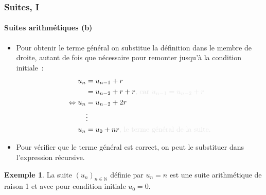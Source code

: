 \documentclass[10pt,notheorems]{beamer}
\theoremstyle{plain}
\theoremstyle{definition} %
\newtheorem{example}{Exemple}
\begin{document}
\begin{frame}
  \frametitle{Suites, I}
  \framesubtitle{Suites arithmétiques (b)}
  \hypertarget{slide_suites_arithmetiques_2}{}

  \bigskip

  \begin{itemize}

  \item Pour obtenir le terme général on substitue la définition dans le membre de droite, autant de fois que nécessaire pour remonter jusqu'à la condition initiale~:
    \[
      \begin{split}
        u_n &= u_{n-1} + r\\
        &= u_{n-2} + r + r{\color{gray}\text{, car }u_{n-1}=u_{n-2}+r}\\
        \Leftrightarrow u_n &= u_{n-2} + 2r\\
        &\vdots\\
        u_n &= u_0 + nr{\color{gray}\text{, le terme général de la suite.}}
      \end{split}
    \]

    \bigskip

  \item Pour vérifier que le terme général est correct, on peut le substituer dans l'expression récursive.\newline

  \end{itemize}

  \begin{example}
    La suite $(u_n)_{n\in\mathbb N}$ définie par $u_n = n$ est une suite arithmétique de raison 1 et avec pour condition initiale $u_0=0$.
  \end{example}

\end{frame}
\end{document}
